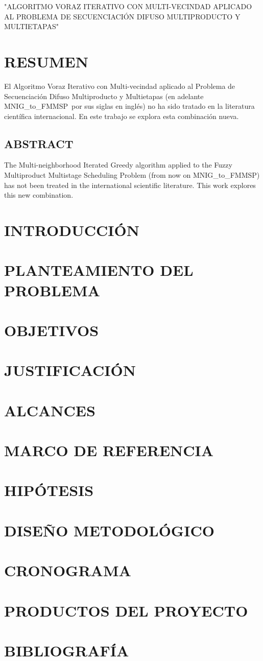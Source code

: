 \documentclass{article}
\def\algmod{MNIG\_to\_FMMSP} %
\begin{document}
"ALGORITMO VORAZ ITERATIVO CON MULTI-VECINDAD APLICADO AL PROBLEMA DE
SECUENCIACIÓN DIFUSO MULTIPRODUCTO Y MULTIETAPAS"

\section{RESUMEN}

El Algoritmo Voraz Iterativo con Multi-vecindad aplicado al Problema de 
Secuenciación Difuso Multiproducto y Multietapas (en adelante 
\algmod\ por sus siglas en inglés) no ha sido tratado en la 
literatura científica internacional. En este trabajo se explora esta
combinación nueva.

\subsection{ABSTRACT}

The Multi-neighborhood Iterated Greedy algorithm applied to the Fuzzy 
Multiproduct Multistage Scheduling Problem (from now on \algmod)
has not been treated in the international scientific literature. This
work explores this new combination.

\section{INTRODUCCIÓN}


\section{PLANTEAMIENTO DEL PROBLEMA}

\section{OBJETIVOS}

\section{JUSTIFICACIÓN}

\section{ALCANCES}

\section{MARCO DE REFERENCIA}

\section{HIPÓTESIS}

\section{DISEÑO METODOLÓGICO}

\section{CRONOGRAMA}

\section{PRODUCTOS DEL PROYECTO}

\section{BIBLIOGRAFÍA}
\end{document}
